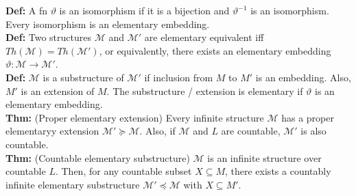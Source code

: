 \documentclass[a4paper,oneside,12pt]{article}
\theoremstyle{definition}
\newcommand{\M}{\ensuremath{\mathcal{M}}}
\renewcommand{\theta}{\vartheta}
\begin{document}
\textbf{Def: }A fn $\theta$ is an isomorphism if it is a bijection and $\theta^{-1}$ is an isomorphism. Every isomorphism is an elementary embedding.\\
\textbf{Def: }Two structures $\M$ and $\M'$ are elementary equivalent iff $Th(\M) = Th(\M')$, or equivalently, there exists an elementary embedding $\theta\colon\M\to\M'$. \\
\textbf{Def: }$\M$ is a substructure of $\M'$ if inclusion from $M$ to $M'$ is an
embedding. Also, $M'$ is an extension of $M$. The substructure / extension is elementary
if $\theta$ is an elementary embedding. \\
\textbf{Thm: }(Proper elementary extension) Every infinite structure $\M$ has a proper elementaryy extension $\M' \succeq \M$. Also, if $\M$ and $L$ are countable, $\M'$ is
also countable.\\
\textbf{Thm: }(Countable elementary substructure) $\M$ is an infinite structure over countable $L$. Then, for any countable subset $X \subseteq M$, there exists a countably infinite elementary substructure $\M' \preceq \M$ with $X \subseteq M'$.
\end{document}
